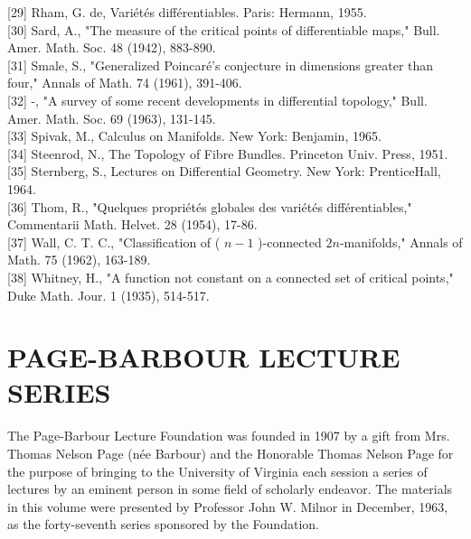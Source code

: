 \documentclass[10pt, letterpaper]{article}
\begin{document}
[29] Rham, G. de, Variétés différentiables. Paris: Hermann, 1955.\\[0pt]
[30] Sard, A., "The measure of the critical points of differentiable maps," Bull. Amer. Math. Soc. 48 (1942), 883-890.\\[0pt]
[31] Smale, S., "Generalized Poincaré's conjecture in dimensions greater than four," Annals of Math. 74 (1961), 391-406.\\[0pt]
[32] -, "A survey of some recent developments in differential topology," Bull. Amer. Math. Soc. 69 (1963), 131-145.\\[0pt]
[33] Spivak, M., Calculus on Manifolds. New York: Benjamin, 1965.\\[0pt]
[34] Steenrod, N., The Topology of Fibre Bundles. Princeton Univ. Press, 1951.\\[0pt]
[35] Sternberg, S., Lectures on Differential Geometry. New York: PrenticeHall, 1964.\\[0pt]
[36] Thom, R., "Quelques propriétés globales des variétés différentiables," Commentarii Math. Helvet. 28 (1954), 17-86.\\[0pt]
[37] Wall, C. T. C., "Classification of ( $n-1$ )-connected $2 n$-manifolds," Annals of Math. 75 (1962), 163-189.\\[0pt]
[38] Whitney, H., "A function not constant on a connected set of critical points," Duke Math. Jour. 1 (1935), 514-517.

\section*{PAGE-BARBOUR LECTURE SERIES}
The Page-Barbour Lecture Foundation was founded in 1907 by a gift from Mrs. Thomas Nelson Page (née Barbour) and the Honorable Thomas Nelson Page for the purpose of bringing to the University of Virginia each session a series of lectures by an eminent person in some field of scholarly endeavor. The materials in this volume were presented by Professor John W. Milnor in December, 1963, as the forty-seventh series sponsored by the Foundation.
\end{document}
